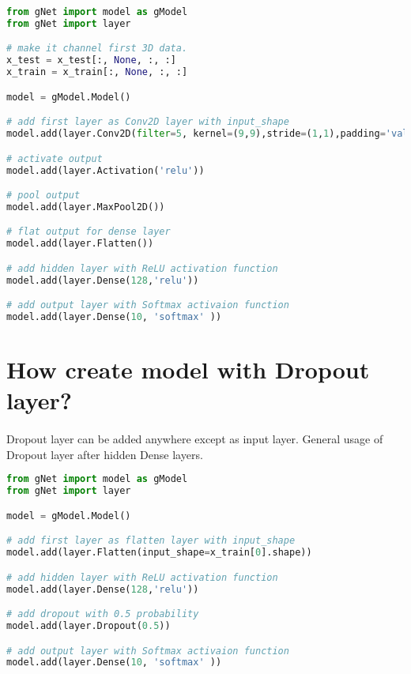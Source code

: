 \documentclass[12pt]{report}
\begin{document}
\begin{lstlisting}[language=Python, numbers=none, caption={Create CNN model.}, label={ex:create-cnn-model}]
from gNet import model as gModel
from gNet import layer

# make it channel first 3D data.
x_test = x_test[:, None, :, :]
x_train = x_train[:, None, :, :]

model = gModel.Model()

# add first layer as Conv2D layer with input_shape
model.add(layer.Conv2D(filter=5, kernel=(9,9),stride=(1,1),padding='valid', input_shape=x_train[0].shape, use_bias=True))

# activate output
model.add(layer.Activation('relu'))

# pool output
model.add(layer.MaxPool2D())

# flat output for dense layer
model.add(layer.Flatten())

# add hidden layer with ReLU activation function
model.add(layer.Dense(128,'relu'))

# add output layer with Softmax activaion function 
model.add(layer.Dense(10, 'softmax' ))

\end{lstlisting}



\section{How create model with Dropout layer?}
\paragraph{}
Dropout layer can be added anywhere except as input layer. General usage of Dropout layer after hidden Dense layers. 

\begin{lstlisting}[language=Python, numbers=none, caption={Create model with Dropout.}, label={ex:create-dropout-model}]
from gNet import model as gModel
from gNet import layer

model = gModel.Model()

# add first layer as flatten layer with input_shape
model.add(layer.Flatten(input_shape=x_train[0].shape))

# add hidden layer with ReLU activation function
model.add(layer.Dense(128,'relu'))

# add dropout with 0.5 probability
model.add(layer.Dropout(0.5))

# add output layer with Softmax activaion function 
model.add(layer.Dense(10, 'softmax' ))

\end{lstlisting}
\end{document}
